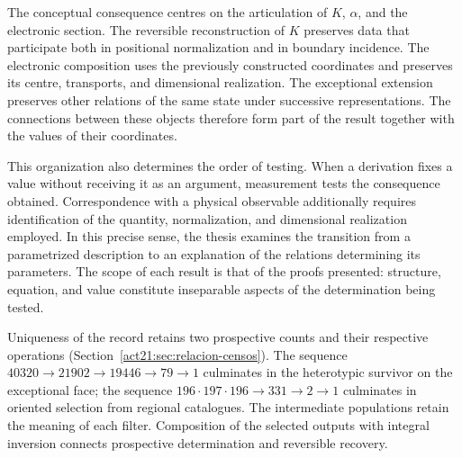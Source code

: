 The conceptual consequence centres on the articulation of \(K\),
\(\alpha\), and the electronic section. The reversible reconstruction of
\(K\) preserves data that participate both in positional normalization
and in boundary incidence. The electronic composition uses the
previously constructed coordinates and preserves its centre, transports,
and dimensional realization. The exceptional extension preserves other
relations of the same state under successive representations. The connections
between these objects therefore form part of the result together with
the values of their coordinates.

This organization also determines the order of testing. When
a derivation fixes a value without receiving it as an argument, measurement
tests the consequence obtained. Correspondence with a
physical observable additionally requires identification of the quantity,
normalization, and dimensional realization employed. In this precise sense,
the thesis examines the transition from a parametrized description to an explanation of
the relations determining its parameters. The scope of each result
is that of the proofs presented: structure, equation, and value
constitute inseparable aspects of the determination being tested.

Uniqueness of the record retains two prospective counts and their
respective operations (Section~\ref{act21:sec:relacion-censos}).
The sequence \(40320\to21902\to19446\to79\to1\) culminates in the
heterotypic survivor on the exceptional face; the sequence
\(196\cdot197\cdot196\to331\to2\to1\) culminates in oriented
selection from regional catalogues. The intermediate populations
retain the meaning of each filter. Composition of the selected outputs
with integral inversion connects prospective determination
and reversible recovery.
